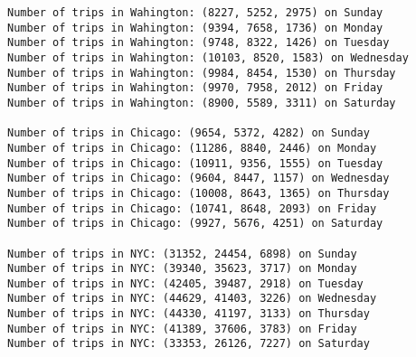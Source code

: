 \documentclass[11pt]{article}
\begin{document}
    \begin{Verbatim}[commandchars=\\\{\}]
Number of trips in Wahington: (8227, 5252, 2975) on Sunday
Number of trips in Wahington: (9394, 7658, 1736) on Monday
Number of trips in Wahington: (9748, 8322, 1426) on Tuesday
Number of trips in Wahington: (10103, 8520, 1583) on Wednesday
Number of trips in Wahington: (9984, 8454, 1530) on Thursday
Number of trips in Wahington: (9970, 7958, 2012) on Friday
Number of trips in Wahington: (8900, 5589, 3311) on Saturday

Number of trips in Chicago: (9654, 5372, 4282) on Sunday
Number of trips in Chicago: (11286, 8840, 2446) on Monday
Number of trips in Chicago: (10911, 9356, 1555) on Tuesday
Number of trips in Chicago: (9604, 8447, 1157) on Wednesday
Number of trips in Chicago: (10008, 8643, 1365) on Thursday
Number of trips in Chicago: (10741, 8648, 2093) on Friday
Number of trips in Chicago: (9927, 5676, 4251) on Saturday

Number of trips in NYC: (31352, 24454, 6898) on Sunday
Number of trips in NYC: (39340, 35623, 3717) on Monday
Number of trips in NYC: (42405, 39487, 2918) on Tuesday
Number of trips in NYC: (44629, 41403, 3226) on Wednesday
Number of trips in NYC: (44330, 41197, 3133) on Thursday
Number of trips in NYC: (41389, 37606, 3783) on Friday
Number of trips in NYC: (33353, 26126, 7227) on Saturday

    \end{Verbatim}

    \begin{center}
    \end{center}
    { \hspace*{\fill} \\}
    
\end{document}
